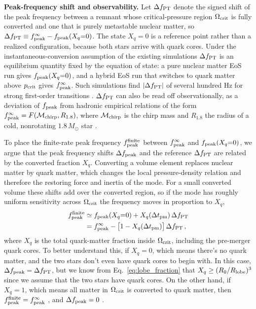 \documentclass[10pt,superscriptaddress,amsmath,aps,prc,twocolumn,nofootinbib,floatfix]{revtex4-1}
\begin{document}
\textbf{Peak-frequency shift and observability.}
Let $\Delta f_{\rm PT}$ denote the signed shift of the peak frequency between a remnant whose critical-pressure region $\Omega_{\rm crit}$ is fully converted and one that is purely metastable nuclear matter, so $\Delta f_{\rm PT}\equiv f_{\rm peak}^{\infty}-f_{\rm peak}(X_q{=}0)$.
The state $X_q=0$ is a reference point rather than a realized configuration, because both stars arrive with quark cores.
Under the instantaneous-conversion assumption of the existing simulations $\Delta f_{\rm PT}$ is an equilibrium quantity fixed by the equation of state: a pure nuclear matter EoS run gives $f_{\rm peak}(X_q{=}0)$, and a hybrid EoS run that switches to quark matter above $p_{\rm crit}$ gives $f_{\rm peak}^{\infty}$.
Such simulations find $|\Delta f_{\rm PT}|$ of several hundred Hz for strong first-order transitions \cite{Bauswein:2018bma,Most:2018eaw,Weih:2019xvw,Prakash:2023afe}.
$\Delta f_{\rm PT}$ can also be read off observationally, as a deviation of $f_{\rm peak}$ from hadronic empirical relations of the form $f_{\rm peak}^{\infty}=F(\mathcal{M}_{\rm chirp},R_{1.8})$, where $\mathcal{M}_{\rm chirp}$ is the chirp mass and $R_{1.8}$ the radius of a cold, nonrotating $1.8\,M_\odot$ star \cite{Bauswein:2012ya,Vretinaris:2019spn}.

To place the finite-rate peak frequency $f_{\rm peak}^{\rm finite}$ between $f^\infty_{\rm peak}$ and $f_{\rm peak}(X_q{=}0)$, we argue that the peak frequency shifts $\Delta f_{\rm peak}$ and the reference $\Delta f_{\rm PT}$ are related by the converted fraction $X_q$.
Converting a volume element replaces nuclear matter by quark matter, which changes the local pressure-density relation and therefore the restoring force and inertia of the mode.
For a small converted volume these shifts add over the converted region, so if the mode has roughly uniform sensitivity across $\Omega_{\rm crit}$ the frequency moves in proportion to $X_q$,
\begin{equation}
\begin{aligned}
f_{\rm peak}^{\rm finite}
&\simeq
f_{\rm peak}(X_q{=}0)+X_q(\Delta t_{\rm pm})\,\Delta f_{\rm PT}
\\
&=
f_{\rm peak}^{\infty}-\bigl[1-X_q(\Delta t_{\rm pm})\bigr]\,\Delta f_{\rm PT}\,,
\end{aligned}
\label{eq:finite_peak_frequency}
\end{equation}
where $X_q$ is the total quark-matter fraction inside $\Omega_{\rm crit}$, including the pre-merger quark cores.
To better understand this, if $X_q = 0$, which means there's no quark matter, and the two stars don't even have quark cores to begin with. 
In this case, $\Delta f_{\rm peak} = \Delta f_{\rm PT}$, but we know from Eq.~\eqref{eq:lobe_fraction} that $X_q\geq (R_0/R_{\rm lobe})^3$ since we assume that the two stars have quark cores.
On the other hand, if $X_q = 1$, which means all matter in $\Omega_{\rm crit}$ is converted to quark matter, then $f_{\rm peak}^{\rm finite} = f_{\rm peak}^{\infty}\ $, and $\Delta f_{\rm peak} = 0\ $.
\end{document}
